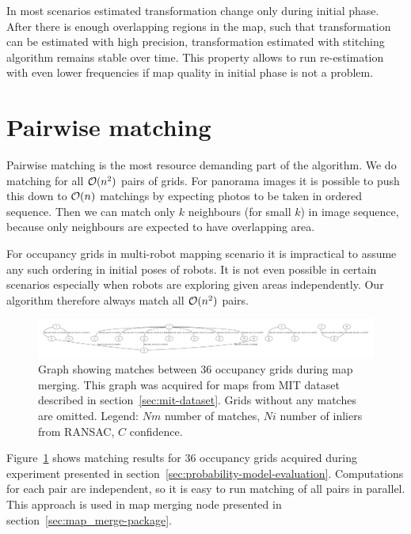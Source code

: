 In most scenarios estimated transformation change only during initial phase. After there is enough overlapping regions in the map, such that transformation can be estimated with high precision, transformation estimated with stitching algorithm remains stable over time. This property allows to run re-estimation with even lower frequencies if map quality in initial phase is not a problem.


\section{Pairwise matching} %
\label{sec:pairwisematching}

Pairwise matching is the most resource demanding part of the algorithm. We do matching for all $\operatorname{\mathcal{O}}(n^2)$ pairs of grids. For panorama images it is possible to push this down to $\operatorname{\mathcal{O}}(n)$ matchings by expecting photos to be taken in ordered sequence. Then we can match only $k$ neighbours (for small $k$) in image sequence, because only neighbours are expected to have overlapping area.

For occupancy grids in multi-robot mapping scenario it is impractical to assume any such ordering in initial poses of robots. It is not even possible in certain scenarios especially when robots are exploring given areas independently. Our algorithm therefore always match all $\operatorname{\mathcal{O}}(n^2)$ pairs.

\begin{figure}
    \centering
    \includegraphics[width=\textwidth]{../img/matches.pdf}
    \caption{Graph showing matches between $36$ occupancy grids during map merging. This graph was acquired for maps from MIT dataset described in section~\ref{sec:mit-dataset}. Grids without any matches are omitted. Legend: $Nm$ number of matches, $Ni$ number of inliers from \gls{RANSAC}, $C$ confidence.}
    \label{fig:matches}
\end{figure}

Figure~\ref{fig:matches} shows matching results for $36$ occupancy grids acquired during experiment presented in section~\ref{sec:probability-model-evaluation}. Computations for each pair are independent, so it is easy to run matching of all pairs in parallel. This approach is used in map merging node presented in section~\ref{sec:map_merge-package}.

